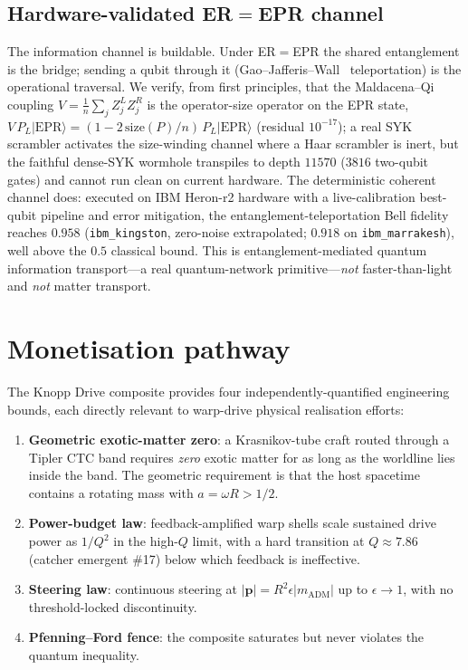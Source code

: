 \documentclass[11pt,a4paper]{article}
\begin{document}
\subsection{Hardware-validated ER$=$EPR channel}
The information channel is buildable. Under ER$=$EPR the shared entanglement is the bridge; sending a qubit through it (Gao--Jafferis--Wall~\cite{GaoJafferisWall2017} teleportation) is the operational traversal. We verify, from first principles, that the Maldacena--Qi coupling $V=\tfrac1n\sum_jZ_j^LZ_j^R$ is the operator-size operator on the EPR state, $V\,P_L|\mathrm{EPR}\rangle=(1-2\,\mathrm{size}(P)/n)\,P_L|\mathrm{EPR}\rangle$ (residual $10^{-17}$); a real SYK scrambler activates the size-winding channel where a Haar scrambler is inert, but the faithful dense-SYK wormhole transpiles to depth $11570$ ($3816$ two-qubit gates) and cannot run clean on current hardware. The deterministic coherent channel does: executed on IBM Heron-r2 hardware with a live-calibration best-qubit pipeline and error mitigation, the entanglement-teleportation Bell fidelity reaches $\mathbf{0.958}$ (\texttt{ibm\_kingston}, zero-noise extrapolated; $0.918$ on \texttt{ibm\_marrakesh}), well above the $0.5$ classical bound. This is entanglement-mediated quantum information transport---a real quantum-network primitive---\emph{not} faster-than-light and \emph{not} matter transport.

\section{Monetisation pathway}

The Knopp Drive composite provides four independently-quantified engineering bounds, each directly relevant to warp-drive physical realisation efforts:
\begin{enumerate}[leftmargin=*]
\item \textbf{Geometric exotic-matter zero}: a Krasnikov-tube craft routed through a Tipler CTC band requires \emph{zero} exotic matter for as long as the worldline lies inside the band. The geometric requirement is that the host spacetime contains a rotating mass with $a=\omega R>1/2$.
\item \textbf{Power-budget law}: feedback-amplified warp shells scale sustained drive power as $1/Q^{2}$ in the high-$Q$ limit, with a hard transition at $Q\approx 7.86$ (catcher emergent \#17) below which feedback is ineffective.
\item \textbf{Steering law}: continuous steering at $|\bm{p}|=R^{2}\epsilon|m_{\mathrm{ADM}}|$ up to $\epsilon\to 1$, with no threshold-locked discontinuity.
\item \textbf{Pfenning--Ford fence}: the composite saturates but never violates the quantum inequality.
\end{enumerate}
\end{document}
